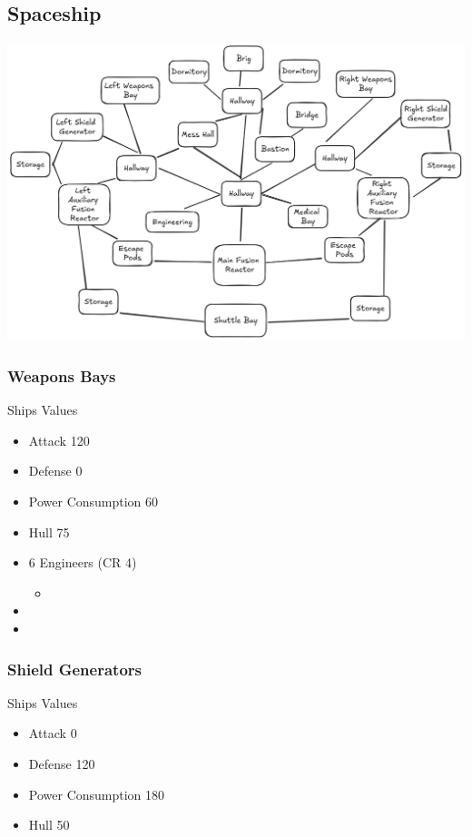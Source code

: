 \documentclass[11pt]{article}
\begin{document}
{\subsection{Spaceship}
\label{sec:org1c1fea8}


\begin{center}
\includegraphics[width=.9\linewidth]{images/Space Ship.png}
\end{center}
\subsubsection{Weapons Bays}
\label{sec:org5e6bf52}
Ships Values
\begin{itemize}
\item Attack 120
\item Defense 0
\item Power Consumption 60
\item Hull 75

\item 6 Engineers (CR 4)
\begin{itemize}
\item {}
\end{itemize}
\item {}
\item {}
\end{itemize}
\subsubsection{Shield  Generators}
\label{sec:org090bcec}
Ships Values
\begin{itemize}
\item Attack 0
\item Defense 120
\item Power Consumption 180
\item Hull 50


\end{itemize}}
\end{document}
